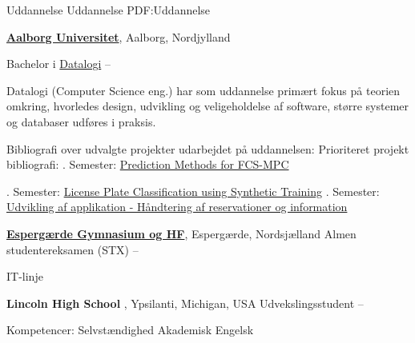 \Section
{Uddannelse}
{Uddannelse}
{PDF:Uddannelse}

\Entry
\href{https://www.aau.dk/}
{\textbf{Aalborg Universitet}},
Aalborg, Nordjylland

\Gap
\BulletItem
Bachelor i
\href{https://www.aau.dk/uddannelser/bachelor/datalogi}
{Datalogi}
\hfill
{} --

\begin{Detail}
\noindent
Datalogi (Computer Science eng.) har som uddannelse primært fokus på teorien omkring, hvorledes design, udvikling og veligeholdelse af software, større systemer og databaser udføres i praksis.

Bibliografi over udvalgte projekter udarbejdet på uddannelsen:
Prioriteret projekt bibliografi:
. Semester:
\href{https://projekter.aau.dk/projekter/da/studentthesis/forudsigelsesmetoder-for-fcsmpc(8ff4d2bc-6e4c-4a62-b733-206a4f661b58).html}{Prediction Methods for FCS-MPC}

. Semester:
\href{https://projekter.aau.dk/projekter/da/studentthesis/license-plate-classification-using-synthetic-training(7364cdfc-5387-498f-829e-7156dbe6ea64).html}{License Plate Classification using Synthetic Training}
. Semester:
\href{https://projekter.aau.dk/projekter/da/studentthesis/udvikling-af-applikation--haandtering-af-reservationer-og-information(0ad3f6db-8374-4394-b44b-451b04a2f7e1).html}{Udvikling af applikation - Håndtering af reservationer og information}

\end{Detail}
\Gap
\Entry
\href{https://www.eg-info.dk}{\textbf{Espergærde Gymnasium og HF}},
Espergærde, Nordsjælland
\Gap
\BulletItem
Almen studentereksamen (STX)
\hfill
{} --
\begin{Detail}
\SubBulletItem
IT-linje
\end{Detail}

\Gap
\Entry
\textbf{Lincoln High School },
Ypsilanti, Michigan, USA
\Gap
\BulletItem
Udvekslingsstudent
\hfill
{} --
\begin{Detail}
Kompetencer:
\SubBulletItem
Selvstændighed
\SubBulletItem
Akademisk Engelsk

\end{Detail}